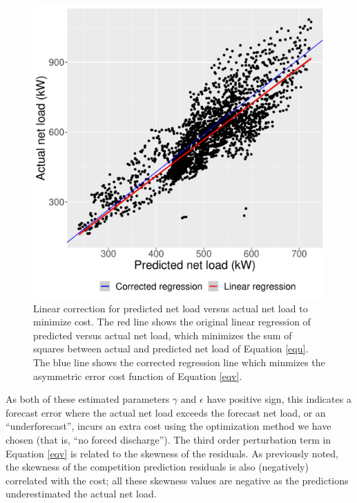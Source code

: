 \documentclass[conference]{IEEEtran}
\begin{document}
\begin{figure}
    \centering
    \includegraphics[scale=.5]{Figures/regression2-10nov22.pdf} %
    \caption{Linear correction for predicted net load versus actual net load to minimize cost. The red line shows the original linear regression of predicted versus actual net load, which minimizes the sum of squares between actual and predicted net load of Equation \ref{equ}. The blue line shows the corrected regression line which minmizes the asymmetric error cost function of Equation \ref{eqv}.}
    \label{fig:netload}
\end{figure}

As both of these estimated parameters $\gamma$ and $\epsilon$ have positive sign, this indicates a forecast error where the actual net load exceeds the forecast net load, or an ``underforecast'', incurs an extra cost using the optimization method we have chosen (that is, ``no forced discharge''). 
The third order perturbation term in Equation \ref{eqv} is related to the skewness of the residuals. As previously noted, the skewness of the competition prediction residuals is also (negatively) correlated with the cost; all these skewness values are negative as the predictions underestimated the actual net load.
\end{document}
